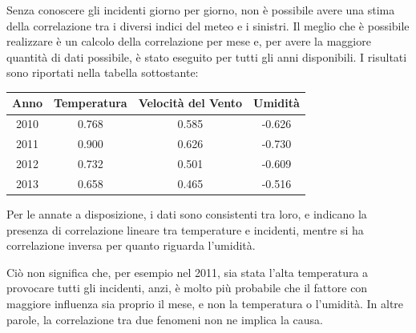 \documentclass[a4paper]{report}
\begin{document}
Senza conoscere gli incidenti giorno per giorno, non è possibile avere una stima della 
correlazione tra i diversi indici del meteo e i sinistri.
Il meglio che è possibile realizzare è un calcolo della correlazione per mese e, per 
avere la maggiore quantità di dati possibile, è stato eseguito per tutti gli 
anni disponibili.
I risultati sono riportati nella tabella sottostante: 

\begin{center}
    \def\arraystretch{1.5}%
    \begin{tabular}{ |c|c|c|c| } 
    \hline
    Anno & Temperatura & Velocità del Vento & Umidità \\ 
    \hline
    \rowcolor{TableGray}
    2010 & 0.768 & 0.585 & -0.626 \\
    2011 & 0.900 & 0.626 & -0.730 \\
    \rowcolor{TableGray}
    2012 & 0.732 & 0.501 & -0.609 \\
    2013 & 0.658 & 0.465 & -0.516 \\
    \hline
    \end{tabular}
\end{center}

Per le annate a disposizione, i dati sono consistenti tra loro, e indicano la presenza di 
correlazione lineare tra temperature e incidenti, mentre si ha correlazione inversa per quanto 
riguarda l'umidità.

Ciò non significa che, per esempio nel 2011, sia stata l'alta temperatura a provocare 
tutti gli incidenti, anzi, è molto più probabile che il fattore con maggiore 
influenza sia proprio il mese, e non la temperatura o l'umidità.
In altre parole, la correlazione tra due fenomeni non ne implica la causa.


\printbibliography
\end{document}
